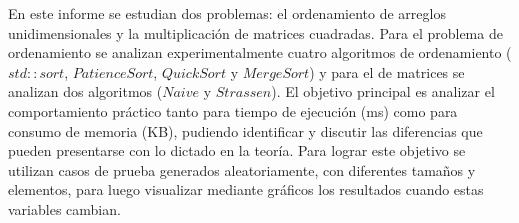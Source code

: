 En este informe se estudian dos problemas: el
ordenamiento de arreglos unidimensionales y la multiplicación de matrices
cuadradas. Para el problema de ordenamiento se analizan experimentalmente cuatro algoritmos de ordenamiento ($std::sort$, $PatienceSort$, $QuickSort$ y $MergeSort$) y para el de matrices se analizan dos algoritmos ($Naive$ y $Strassen$). El objetivo principal es analizar el comportamiento práctico tanto para tiempo de ejecución (ms) como para consumo de memoria (KB), pudiendo identificar y discutir las diferencias que pueden presentarse con lo dictado en la teoría.
Para lograr este objetivo se utilizan casos de prueba generados aleatoriamente, con diferentes tamaños y elementos, para luego visualizar mediante gráficos los resultados cuando estas variables cambian.